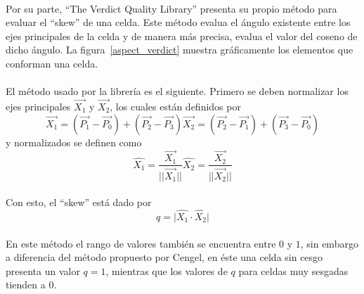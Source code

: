 \documentclass[letterpaper, openright, 12pt]{book}
\begin{document}
    \paragraph*{}
    Por su parte, ``The Verdict Quality Library'' presenta su propio método para
    evaluar el ``skew'' de una celda. Este método evalua el ángulo existente
    entre los ejes principales de la celda y de manera más precisa, evalua el
    valor del coseno de dicho ángulo. La figura~\ref{aspect_verdict} muestra
    gráficamente los elementos que conforman una celda.

    \paragraph*{}
    El método usado por la librería es el siguiente. Primero se deben normalizar
    los ejes principales $\vec{X_1}$ y $\vec{X_2}$, los cuales están definidos
    por
    \begin{subequations}
    \begin{equation}
      \vec{X_1} = (\vec{P_1} - \vec{P_0}) + (\vec{P_2} - \vec{P_3})
    \end{equation}
    \begin{equation}
      \vec{X_2} = (\vec{P_2} - \vec{P_1}) + (\vec{P_3} - \vec{P_0})
    \end{equation}
    \end{subequations}
    y normalizados se definen como
    \begin{subequations}
      \begin{equation}
        \hat{X_1} = \frac{\vec{X_1}}{\lvert\lvert\vec{X_1}\rvert\rvert}
      \end{equation}
      \begin{equation}
        \hat{X_2} = \frac{\vec{X_2}}{\lvert\lvert\vec{X_2}\rvert\rvert}
      \end{equation}
    \end{subequations}

    \paragraph*{}
    Con esto, el ``skew'' está dado por
    \begin{equation}
      q = \lvert \hat{X_1} \cdot \hat{X_2} \rvert
    \end{equation}

    \paragraph*{}
    En este método el rango de valores también se encuentra entre $0$ y $1$, sin
    embargo a diferencia del método propuesto por Cengel, en éste una celda sin
    cesgo presenta un valor $q = 1$, mientras que los valores de $q$ para celdas
    muy sesgadas tienden a $0$.
\end{document}
